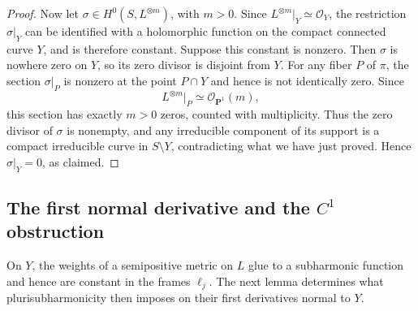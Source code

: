 \documentclass[11pt]{amsart}
\theoremstyle{definition}
\theoremstyle{remark}
\numberwithin{equation}{section}
\newcommand{\PP}{\mathbf P}
\newcommand{\OO}{\mathcal O}
\begin{document}
\begin{proof}
Now let $\sigma\in H^0(S,L^{\otimes m})$, with $m>0$.
Since $L^{\otimes m}|_Y\simeq\OO_Y$, the restriction
$\sigma|_Y$ can be identified with a holomorphic function
on the compact connected curve $Y$, and is therefore constant.
Suppose this constant is nonzero. Then $\sigma$ is nowhere
zero on $Y$, so its zero divisor is disjoint from $Y$.
For any fiber $P$ of $\pi$, the section $\sigma|_P$ is
nonzero at the point $P\cap Y$ and hence is not identically
zero. Since
\[
 L^{\otimes m}|_P\simeq\OO_{\PP^1}(m),
\]
this section has exactly $m>0$ zeros, counted with multiplicity.
Thus the zero divisor of $\sigma$ is nonempty, and any
irreducible component of its support is a compact irreducible
curve in $S\setminus Y$, contradicting what we have just proved.
Hence $\sigma|_Y=0$, as claimed.
\end{proof}

\subsection{The first normal derivative and the $C^1$ obstruction}

On $Y$, the weights of a semipositive metric on $L$ glue to a
subharmonic function and hence are constant in the frames $\ell_j$.
The next lemma determines what plurisubharmonicity then imposes on
their first derivatives normal to $Y$.
\end{document}
